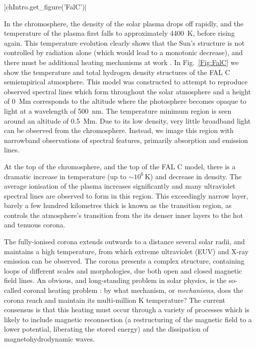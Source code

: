 \py[Intro]|chIntro.get_figure('FalC')|

In the chromosphere, the density of the solar plasma drops off rapidly, and the temperature of the plasma first falls to approximately \SI{4400}{\kelvin}, before rising again.
This temperature evolution clearly shows that the Sun's structure is not controlled by radiation alone (which would lead to a monotonic decrease), and there must be additional heating mechanisms at work \citep{Gurman1992}.
In Fig.~\ref{Fig:FalC} we show the temperature and total hydrogen density structures of the FAL C semiempirical atmosphere.
This model was constructed to attempt to reproduce observed spectral lines which form throughout the solar atmosphere and a height of \SI{0}{\mega\m} corresponds to the altitude where the photosphere becomes opaque to light at a wavelength of \SI{500}{\nano\m}.
The temperature minimum region is seen around an altitude of \SI{0.5}{\mega\metre}.
Due to its low density, very little broadband light can be observed from the chromosphere.
Instead, we image this region with narrowband observations of spectral features, primarily absorption and emission lines.

At the top of the chromosphere, and the top of the FAL C model, there is a dramatic increase in temperature (up to $\sim 10^6\,\si{\kelvin}$) and decrease in density.
The average ionisation of the plasma increases significantly and many ultraviolet spectral lines are observed to form in this region.
This exceedingly narrow layer, barely a few hundred kilometres thick is known as the transition region, as controls the atmosphere's transition from the its denser inner layers to the hot and tenuous corona.

The fully-ionised corona extends outwards to a distance several solar radii, and maintains a high temperature, from which extreme ultraviolet (EUV) and X-ray emission can be observed.
The corona presents a complex structure, containing loops of different scales and morphologies, due both open and closed magnetic field lines.
An obvious, and long-standing problem in solar physics, is the so-called coronal heating problem \citep[reviewed by ][]{Klimchuk2006}: by what mechanism, or \emph{mechanisms}, does the corona reach and maintain its multi-million \si{\kelvin} temperature?
The current consensus \citep[][ and references therein]{DeMoortel2015} is that this heating must occur through a variety of processes which is likely to include magnetic reconnection (a restructuring of the magnetic field to a lower potential, liberating the stored energy) and the dissipation of magnetohydrodynamic waves.


